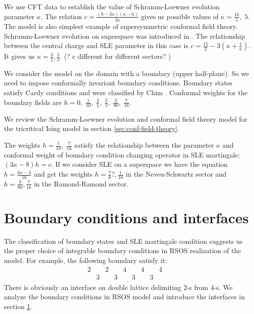 \documentclass[12pt]{article}
\begin{document}
We use CFT data to establish the value of Schramm-Loewner evolution parameter $\kappa$. The relation
$c=\frac{(8-3\kappa)(\kappa-6)}{2\kappa}$ gives us possible values of $\kappa=\frac{16}{5},\; 5$.
The model is also simplest example of supersymmetric conformal field theory. Schramm-Loewner
evolution on superspace was introduced in \cite{nagi2005stochastic,rasmussen2004stochastic}. The
relationship between the central charge and SLE parameter in this case is
$c=\frac{15}{2}-3\left(\kappa+\frac{1}{\kappa}\right)$. It gives us
$\kappa=\frac{3}{5},\frac{5}{3}$. (? c different for different sectors? )

We consider the model on the domain with a boundary (upper half-plane). So we need to impose
conformally invariant boundary conditions. Boundary states satisfy Cardy conditions and were
classified by Chim \cite{chim1996boundary}. Conformal weights for the boundary fields are $h=0,\;
\frac{1}{10},\; \frac{3}{5},\; \frac{3}{2},\; \frac{3}{80},\; \frac{7}{16}$.

We review the Schramm-Loewner evolution and conformal field theory model for the tricritical Ising
model in section \ref{sec:conf-field-theory}. 

The weights $h=\frac{1}{10},\; \frac{7}{16}$ satisfy the relationship between the parameter $\kappa$
and conformal weight of boundary condition changing operator in SLE martingale: $(3\kappa-8) h =c$.
If we consider SLE on a superspace we have the equation $h=\frac{6\kappa-3}{16}$ and get the weights
$h=\frac{7}{6}?, \frac{1}{10}$ in the Neveu-Schwartz sector and $h=\frac{3}{80}, \frac{7}{16}$ in
the Ramond-Ramond sector.

\section{Boundary conditions and interfaces}
\label{sec:bound-cond-interf}


The classification of boundary states and SLE martingale condition suggests us the proper choice of
integrable boundary conditions in RSOS realization of the model. For example, the following boundary
satisfy it:
\begin{equation}
  \label{eq:2}
  \underline{\begin{array}{llllllllll}
    2 & & 2 & & 4 & & 4 & & 4\\
    &  3 & & 3 & & 3 & & 3 & &
  \end{array}}
\end{equation}
There is obviously an interface on double lattice delimiting $2$-s from $4$-s. We analyze the
boundary conditions in RSOS model and  introduce the interfaces in section
\ref{sec:bound-cond-interf}. 
\end{document}
